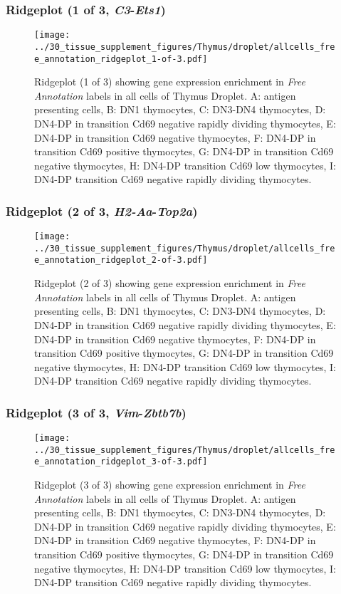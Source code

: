 \clearpage

\subsubsection{Ridgeplot (1 of 3, \emph{C3}-\emph{Ets1})}
\begin{figure}[h]
\centering
\texttt{[image: ../30\_tissue\_supplement\_figures/Thymus/droplet/allcells\_free\_annotation\_ridgeplot\_1-of-3.pdf]}

\caption{ Ridgeplot (1 of 3)  showing gene expression enrichment in \emph{Free Annotation} labels in all cells of Thymus Droplet. A: antigen presenting cells, B: DN1 thymocytes, C: DN3-DN4 thymocytes, D: DN4-DP in transition Cd69 negative rapidly dividing thymocytes, E: DN4-DP in transition Cd69 negative thymocytes, F: DN4-DP in transition Cd69 positive thymocytes, G: DN4-DP in transition Cd69 negative thymocytes, H: DN4-DP transition Cd69 low thymocytes, I: DN4-DP transition Cd69 negative rapidly dividing thymocytes.}
\end{figure}


\clearpage

\subsubsection{Ridgeplot (2 of 3, \emph{H2-Aa}-\emph{Top2a})}
\begin{figure}[h]
\centering
\texttt{[image: ../30\_tissue\_supplement\_figures/Thymus/droplet/allcells\_free\_annotation\_ridgeplot\_2-of-3.pdf]}

\caption{ Ridgeplot (2 of 3)  showing gene expression enrichment in \emph{Free Annotation} labels in all cells of Thymus Droplet. A: antigen presenting cells, B: DN1 thymocytes, C: DN3-DN4 thymocytes, D: DN4-DP in transition Cd69 negative rapidly dividing thymocytes, E: DN4-DP in transition Cd69 negative thymocytes, F: DN4-DP in transition Cd69 positive thymocytes, G: DN4-DP in transition Cd69 negative thymocytes, H: DN4-DP transition Cd69 low thymocytes, I: DN4-DP transition Cd69 negative rapidly dividing thymocytes.}
\end{figure}


\clearpage

\subsubsection{Ridgeplot (3 of 3, \emph{Vim}-\emph{Zbtb7b})}
\begin{figure}[h]
\centering
\texttt{[image: ../30\_tissue\_supplement\_figures/Thymus/droplet/allcells\_free\_annotation\_ridgeplot\_3-of-3.pdf]}

\caption{ Ridgeplot (3 of 3)  showing gene expression enrichment in \emph{Free Annotation} labels in all cells of Thymus Droplet. A: antigen presenting cells, B: DN1 thymocytes, C: DN3-DN4 thymocytes, D: DN4-DP in transition Cd69 negative rapidly dividing thymocytes, E: DN4-DP in transition Cd69 negative thymocytes, F: DN4-DP in transition Cd69 positive thymocytes, G: DN4-DP in transition Cd69 negative thymocytes, H: DN4-DP transition Cd69 low thymocytes, I: DN4-DP transition Cd69 negative rapidly dividing thymocytes.}
\end{figure}



